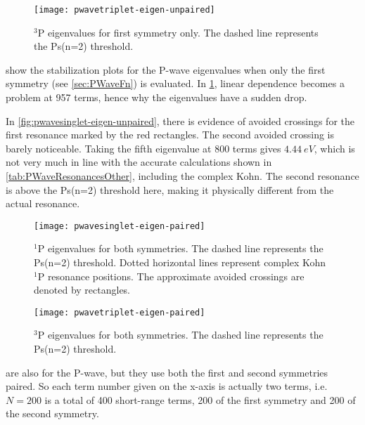\documentclass[Dissertation.tex]{subfiles}
\begin{document}
\begin{figure}
	\centering
	\texttt{[image: pwavetriplet-eigen-unpaired]}
	\caption[$^3$P eigenvalues for first symmetry only]{$^3$P eigenvalues for first symmetry only. The dashed line represents the Ps(n=2) threshold.}
	\label{fig:pwavetriplet-eigen-unpaired}
\end{figure}

 show 
the stabilization plots for the P-wave eigenvalues when only the first 
symmetry (see \cref{sec:PWaveFn}) is evaluated. %
In \cref{fig:pwavetriplet-eigen-unpaired}, linear dependence becomes a 
problem at 957 terms, hence why the eigenvalues have a sudden drop.

In \cref{fig:pwavesinglet-eigen-unpaired}, there is evidence of avoided 
crossings for the first resonance marked by the red rectangles. The second 
avoided crossing is barely noticeable. Taking the fifth eigenvalue at 800 
terms gives $\SI{4.44}{eV}$, which is not very much in line with the accurate 
calculations shown in \cref{tab:PWaveResonancesOther}, including the complex 
Kohn. The second resonance is above the Ps(n=2) threshold here, making it 
physically different from the actual resonance.

\begin{figure}
	\centering
	\texttt{[image: pwavesinglet-eigen-paired]}
	\caption[$^1$P eigenvalues for both symmetries]{$^1$P eigenvalues for both symmetries. The dashed line represents the Ps(n=2) threshold. Dotted horizontal lines represent complex Kohn $^1$P resonance positions. The approximate avoided crossings are denoted by rectangles.}
	\label{fig:pwavesinglet-eigen-paired}
\end{figure}

\begin{figure}
	\centering
	\texttt{[image: pwavetriplet-eigen-paired]}
	\caption[$^3$P eigenvalues for both symmetries]{$^3$P eigenvalues for both symmetries. The dashed line represents the Ps(n=2) threshold.}
	\label{fig:pwavetriplet-eigen-paired}
\end{figure}

 are also 
for the P-wave, but they use both the first and second symmetries paired. So 
each term number given on the x-axis is actually two terms, i.e. $N = 200$ is 
a total of 400 short-range terms, 200 of the first symmetry and 200 of the 
second symmetry. %
\end{document}
